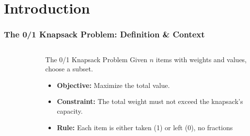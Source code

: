 \section{Introduction}
\begin{frame}
    \frametitle{The 0/1 Knapsack Problem: Definition \& Context}

    \begin{columns}[T] %
        
        \begin{column}{0.4\textwidth}
            \begin{figure}
                \centering
                
                
                \vspace{-1em} %
                
                
            \end{figure}
        \end{column}
        
        \begin{column}{0.6\textwidth}
            
            \begin{block}{The 0/1 Knapsack Problem}
                Given $n$ items with weights and values, choose a subset.
                \begin{itemize}
                    \item \textbf{Objective:} Maximize the total value.
                    \item \textbf{Constraint:} The total weight must not exceed the knapsack's capacity.
                    \item \textbf{Rule:} Each item is either taken (1) or left (0), no fractions
                \end{itemize}
            \end{block}


\end{column}
\end{columns}
\end{frame}
